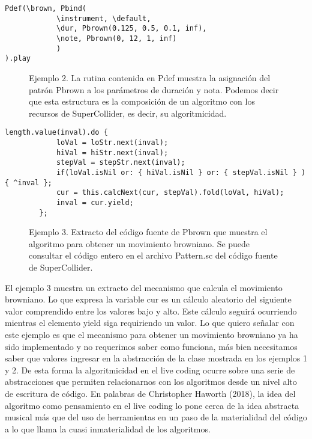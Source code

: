 \begin{verbatim}
Pdef(\brown, Pbind(
            \instrument, \default,
            \dur, Pbrown(0.125, 0.5, 0.1, inf),
            \note, Pbrown(0, 12, 1, inf)
            )
).play
\end{verbatim}

\begin{figure}[h]
Ejemplo 2. La rutina contenida en Pdef muestra la asignación del patrón Pbrown a los parámetros de duración y nota. Podemos decir que esta estructura es la composición de un algoritmo con los recursos de SuperCollider, es decir, su algoritmicidad.
\end{figure}

\begin{verbatim}
length.value(inval).do {
            loVal = loStr.next(inval);
            hiVal = hiStr.next(inval);
            stepVal = stepStr.next(inval);
            if(loVal.isNil or: { hiVal.isNil } or: { stepVal.isNil } ) { ^inval };
            cur = this.calcNext(cur, stepVal).fold(loVal, hiVal);
            inval = cur.yield;
        };
\end{verbatim}
 
\begin{figure}[h]
Ejemplo 3. Extracto del código fuente de Pbrown que muestra el algoritmo para obtener un movimiento browniano. Se puede consultar el código entero en el archivo Pattern.sc del código fuente de SuperCollider.
\end{figure}

El ejemplo 3 muestra un extracto del mecanismo que calcula el movimiento browniano. Lo que expresa la variable cur es un cálculo aleatorio del siguiente valor comprendido entre los valores bajo y alto. Este cálculo seguirá ocurriendo mientras el elemento yield siga requiriendo un valor. Lo que quiero señalar con este ejemplo es que el mecanismo para obtener un movimiento browniano ya ha sido implementado y no requerimos saber como funciona, más bien necesitamos saber que valores ingresar en la abstracción de la clase mostrada en los ejemplos 1 y 2. De esta forma la algoritmicidad en el live coding ocurre sobre una serie de abstracciones que permiten relacionarnos con los algoritmos desde un nivel alto de escritura de código. En palabras de Christopher Haworth (2018), la idea del algoritmo como pensamiento en el live coding lo pone cerca de la idea abstracta musical más que del uso de herramientas en un paso de la materialidad del código a lo que llama la cuasi inmaterialidad de los algoritmos.

